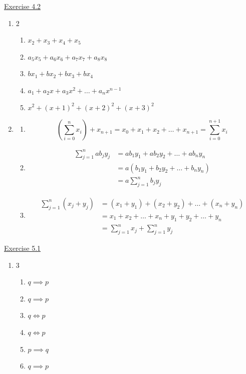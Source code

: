 

\underline{Exercise 4.2}  
\begin{enumerate}
\item[6.]
\begin{multicols}{2}
\begin{enumerate}\renewcommand{\labelenumi}{\alph{enumi})}
\item $x_{2}+x_{3}+x_{4}+x_{5}$
\item $a_{5} x_{5}+a_{6} x_{6}+a_{7} x_{7}+a_{8} x_{8}$
\item $b x_{1}+b x_{2}+b x_{3}+b x_{4}$
\item $a_{1}+a_{2} x+a_{3} x^{2}+\ldots+a_{n} x^{n-1}$
\item $x^{2}+(x+1)^{2}+(x+2)^{2}+(x+3)^{2}$  

\vspace{1em}
\end{enumerate}
\end{multicols}

\item[8.] 
\begin{enumerate}
\item \[ \left(\sum_{i=0}^{n} x_{i} \right)+x_{n+1} =x_{0}+x_{1}+x_{2}+\ldots+x_{n+1}  =\sum_{i=0}^{n+1} x_{i} \]
\item \[ \begin{aligned} 
\sum_{j=1}^{n} a b_{j} y_{j}&=a b_{1} y_{1}+a b_{2} y_{2}+\ldots+a b_{n} y_{n} \\ 
&= a\left(b_{1} y_{1}+b_{2} y_{2}+\ldots+b_{n} y_{n}\right) \\
&= a \sum_{j=1}^{n} b_{j} y_{j} \end{aligned}\]
\item \[ \begin{aligned}  \sum_{j=1}^{n}\left(x_{j}+y_{j}\right) 
& =\left(x_{1}+y_{1}\right)+\left(x_{2}+y_{2}\right)+\ldots+\left(x_{n}+y_{n}\right) \\
& =x_{1}+x_{2}+\ldots+x_{n}+y_{1}+y_{2}+\ldots+y_{n} \\
& =\sum_{j=1}^{n} x_{j}+\sum_{j=1}^{n} y_{j} \end{aligned} \]
\end{enumerate}
\end{enumerate}



\underline{Exercise 5.1}  
\begin{enumerate}
\item[1.] \begin{multicols}{3}
\begin{enumerate}\renewcommand{\labelenumi}{\alph{enumi})}
\item $ q \implies p $
\item $ q \implies p $
\item $ q \iff p $
\item $ q \iff p $
\item $ p \implies q $
\item $ q \implies p $
\end{enumerate}
\end{multicols}
\end{enumerate}
